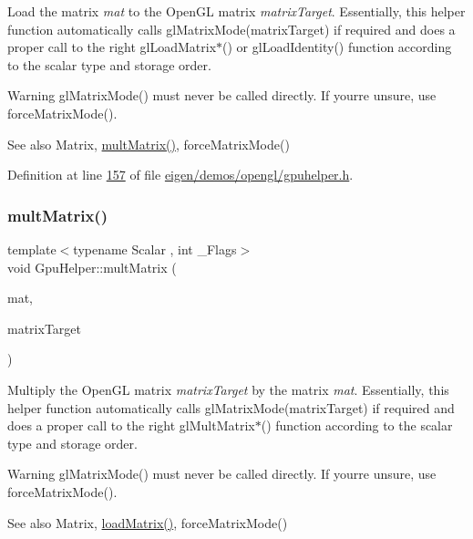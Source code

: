 Load the matrix {\itshape mat} to the Open\+GL matrix {\itshape matrix\+Target}. Essentially, this helper function automatically calls gl\+Matrix\+Mode(matrix\+Target) if required and does a proper call to the right gl\+Load\+Matrix$\ast$() or gl\+Load\+Identity() function according to the scalar type and storage order. \begin{DoxyWarning}{Warning}
gl\+Matrix\+Mode() must never be called directly. If your\textquotesingle{}re unsure, use force\+Matrix\+Mode(). 
\end{DoxyWarning}
\begin{DoxySeeAlso}{See also}
Matrix, \hyperlink{class_gpu_helper_a3abb45392e7dcf6450fa94bd345d9096}{mult\+Matrix()}, force\+Matrix\+Mode() 
\end{DoxySeeAlso}


Definition at line \hyperlink{eigen_2demos_2opengl_2gpuhelper_8h_source_l00157}{157} of file \hyperlink{eigen_2demos_2opengl_2gpuhelper_8h_source}{eigen/demos/opengl/gpuhelper.\+h}.

\mbox{\label{class_gpu_helper_a3abb45392e7dcf6450fa94bd345d9096}} 
\subsubsection{\texorpdfstring{mult\+Matrix()}{multMatrix()}\hspace{0.1cm}{\footnotesize\ttfamily [1/2]}}
{\footnotesize\ttfamily template$<$typename Scalar , int \+\_\+\+Flags$>$ \\
void Gpu\+Helper\+::mult\+Matrix (\begin{DoxyParamCaption}\item[{const \hyperlink{group___core___module_class_eigen_1_1_matrix}{Matrix}$<$ Scalar, 4, 4, \+\_\+\+Flags, 4, 4 $>$ \&}]{mat,  }\item[{G\+Lenum}]{matrix\+Target }\end{DoxyParamCaption})}

Multiply the Open\+GL matrix {\itshape matrix\+Target} by the matrix {\itshape mat}. Essentially, this helper function automatically calls gl\+Matrix\+Mode(matrix\+Target) if required and does a proper call to the right gl\+Mult\+Matrix$\ast$() function according to the scalar type and storage order. \begin{DoxyWarning}{Warning}
gl\+Matrix\+Mode() must never be called directly. If your\textquotesingle{}re unsure, use force\+Matrix\+Mode(). 
\end{DoxyWarning}
\begin{DoxySeeAlso}{See also}
Matrix, \hyperlink{class_gpu_helper_a31ac77373dc54409648558d79d5a8c3e}{load\+Matrix()}, force\+Matrix\+Mode() 
\end{DoxySeeAlso}


